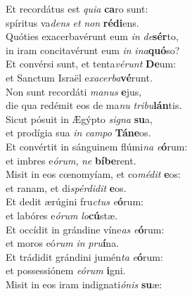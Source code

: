 \evenverse Et recordátus est \textit{qui}\textit{a} \textbf{ca}ro sunt:~\*\\
\evenverse spíritus va\textit{dens} \textit{et} \textit{non} \textbf{ré}\textbf{di}ens.\\
\oddverse Quóties exacerbavérunt eum \textit{in} \textit{de}\textbf{sér}to,~\*\\
\oddverse in iram concitavérunt eum \textit{in} \textit{i}\textit{na}\textbf{quó}so?\\
\evenverse Et convérsi sunt, et tenta\textit{vé}\textit{runt} \textbf{De}um:~\*\\
\evenverse et Sanctum Israël e\textit{xa}\textit{cer}\textit{ba}\textbf{vé}runt.\\
\oddverse Non sunt recordáti \textit{ma}\textit{nus} \textbf{e}jus,~\*\\
\oddverse die qua redémit eos de ma\textit{nu} \textit{tri}\textit{bu}\textbf{lán}tis.\\
\evenverse Sicut pósuit in Ægýpto \textit{si}\textit{gna} \textbf{su}a,~\*\\
\evenverse et prodígia sua \textit{in} \textit{cam}\textit{po} \textbf{Tá}\textbf{ne}os.\\
\oddverse Et convértit in sánguinem flúmi\textit{na} \textit{e}\textbf{ó}rum:~\*\\
\oddverse et imbres e\textit{ó}\textit{rum}, \textit{ne} \textbf{bí}\textbf{be}rent.\\
\evenverse Misit in eos cœnomyíam, et co\textit{mé}\textit{dit} \textbf{e}os:~\*\\
\evenverse et ranam, et di\textit{spér}\textit{di}\textit{dit} \textbf{e}os.\\
\oddverse Et dedit ærúgini fru\textit{ctus} \textit{e}\textbf{ó}rum:~\*\\
\oddverse et labóres e\textit{ó}\textit{rum} \textit{lo}\textbf{cú}stæ.\\
\evenverse Et occídit in grándine víne\textit{as} \textit{e}\textbf{ó}rum:~\*\\
\evenverse et moros eó\textit{rum} \textit{in} \textit{pru}\textbf{í}na.\\
\oddverse Et trádidit grándini jumén\textit{ta} \textit{e}\textbf{ó}rum:~\*\\
\oddverse et possessiónem \textit{e}\textit{ó}\textit{rum} \textbf{i}gni.\\
\evenverse Misit in eos iram indignati\textit{ó}\textit{nis} \textbf{su}æ:~\*\\
